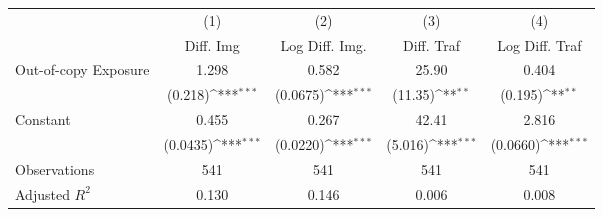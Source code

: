 {
\def\sym#1{\ifmmode^{#1}\else\(^{#1}\)\fi}
\begin{tabular*}{\hsize}{@{\hskip\tabcolsep\extracolsep\fill}l*{4}{c}}
\toprule
                    &\multicolumn{1}{c}{(1)}&\multicolumn{1}{c}{(2)}&\multicolumn{1}{c}{(3)}&\multicolumn{1}{c}{(4)}\\
                    &\multicolumn{1}{c}{Diff. Img}&\multicolumn{1}{c}{Log Diff. Img.}&\multicolumn{1}{c}{Diff. Traf}&\multicolumn{1}{c}{Log Diff. Traf}\\
\midrule
Out-of-copy Exposure&       1.298         &       0.582         &       25.90         &       0.404         \\
                    &     (0.218)\sym{***}&    (0.0675)\sym{***}&     (11.35)\sym{**} &     (0.195)\sym{**} \\
\addlinespace
Constant            &       0.455         &       0.267         &       42.41         &       2.816         \\
                    &    (0.0435)\sym{***}&    (0.0220)\sym{***}&     (5.016)\sym{***}&    (0.0660)\sym{***}\\
\midrule
Observations        &         541         &         541         &         541         &         541         \\
Adjusted \(R^{2}\)  &       0.130         &       0.146         &       0.006         &       0.008         \\
\bottomrule
\end{tabular*}
}
